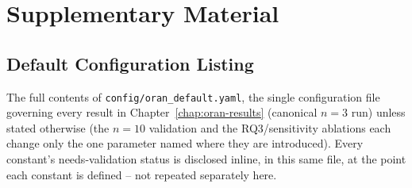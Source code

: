 %

\appendix

\chapter{Supplementary Material}
\label{chap:oran-appendix}

\section{Default Configuration Listing}
\label{sec:oran-appendix-config}

The full contents of \texttt{config/oran\_default.yaml}, the single
configuration file governing every result in
Chapter~\ref{chap:oran-results} (canonical $n=3$ run) unless stated
otherwise (the $n=10$ validation and the RQ3/sensitivity ablations each
change only the one parameter named where they are introduced). Every
constant's needs-validation status is disclosed inline, in this same file,
at the point each constant is defined -- not repeated separately here.

